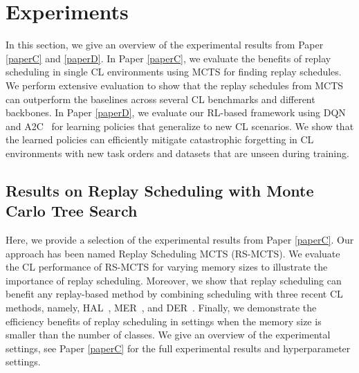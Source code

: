 \section{Experiments}\label{chap4:sec:experiments}

In this section, we give an overview of the experimental results from Paper \ref{paperC} and \ref{paperD}. In Paper \ref{paperC}, we evaluate the benefits of replay scheduling in single CL environments using MCTS for finding replay schedules. We perform extensive evaluation to show that the replay schedules from MCTS can outperform the baselines across several CL benchmarks and different backbones. 
In Paper \ref{paperD}, we evaluate our RL-based framework using DQN~\cite{mnih2013playing} and A2C~\cite{mnih2016asynchronous} for learning policies that generalize to new CL scenarios.
We show that the learned policies can efficiently mitigate catastrophic forgetting in CL environments with new task orders and datasets that are unseen during training. 


\subsection{Results on Replay Scheduling with Monte Carlo Tree Search}

Here, we provide a selection of the experimental results from Paper \ref{paperC}. Our approach has been named Replay Scheduling MCTS (RS-MCTS). 
We evaluate the CL performance of RS-MCTS for varying memory sizes to illustrate the importance of replay scheduling. Moreover, we show that replay scheduling can benefit any replay-based method by combining scheduling with three recent CL methods, namely, HAL~\cite{chaudhry2021using}, MER~\cite{riemer2018learning}, and DER~\cite{buzzega2020dark}. Finally, we demonstrate the efficiency benefits of replay scheduling in settings when the memory size is smaller than the number of classes. We give an overview of the experimental settings, see Paper \ref{paperC} for the full experimental results and hyperparameter settings. 

